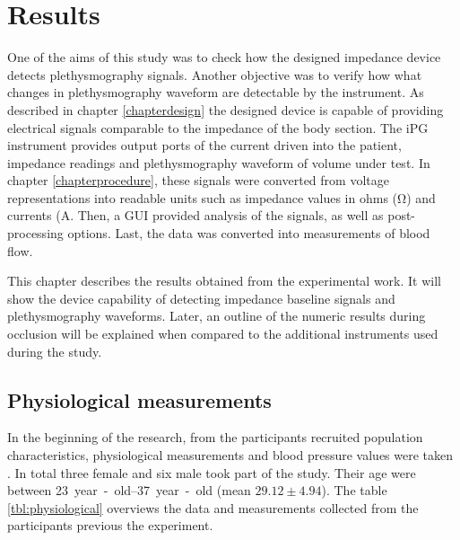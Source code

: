 
\chapter{Results}  %
\label{chapterresults}

\ifpdf
\graphicspath{{Chapter5/Figs/Raster/}{Chapter5/Figs/PDF/}{Chapter5/Figs/}}
\else
\graphicspath{{Chapter5/Figs/Vector/}{Chapter5/Figs/}}
\fi

One of the aims of this study was to check how the designed impedance device detects plethysmography signals. Another objective was to verify how what changes in plethysmography waveform are detectable by the instrument. As described in chapter \ref{chapterdesign} the designed device is capable of providing electrical signals comparable to the impedance of the body section. The iPG instrument provides output ports of the current driven into the patient, impedance readings and plethysmography waveform of volume under test. In chapter \ref{chapterprocedure}, these signals were converted from voltage representations into readable units such as impedance values in ohms (\si{\ohm}) and currents (\si{\ampere}. Then, a GUI provided analysis of the signals, as well as post-processing options. Last, the data was converted into measurements of blood flow.


This chapter describes the results obtained from the experimental work. It will show the device capability of detecting impedance baseline signals and plethysmography waveforms. Later, an outline of the numeric results during occlusion will be explained when compared to the additional instruments used during the study. 



\section{Physiological measurements}
\label{section5.1}
In the beginning of the research, from the participants recruited population characteristics, physiological measurements and blood pressure values were taken . In total three female and six male took part of the study. Their age were between \SIrange{23}{37}{year-old} (mean $29.12 \pm 4.94$). The table \ref{tbl:physiological} overviews the data and measurements collected from the participants previous the experiment.

